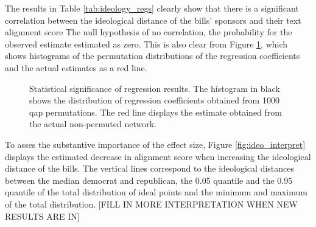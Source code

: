 \documentclass[12pt]{article} %
\begin{document}


The results in Table \ref{tab:ideology_regs} clearly show that there is a significant correlation between the ideological distance of the bills' sponsors and their text alignment score The null hypothesis of no correlation, the probability for the observed estimate estimated as zero. This is also clear from Figure \ref{fig:qap_dist}, which shows histograms of the permutation distributions of the regression coefficients and the actual estimates as a red line. 

\begin{figure}[ht!]
\caption{Statistical significance of regression results. The histogram in black shows the distribution of regression coefficients obtained from 1000 qap permutations. The red line displays the estimate obtained from the actual non-permuted network.}
\label{fig:qap_dist}
\end{figure}

To asses the substantive importance of the effect size, Figure \ref{fig:ideo_interpret} displays the estimated decrease in alignment score when increasing the ideological distance of the bills. The vertical lines correspond to the ideological distances between the median democrat and republican, the 0.05 quantile and the 0.95 quantile of the total distribution of ideal points and the minimum and maximum of the total distribution. [FILL IN MORE INTERPRETATION WHEN NEW RESULTS ARE IN] 
\end{document}
